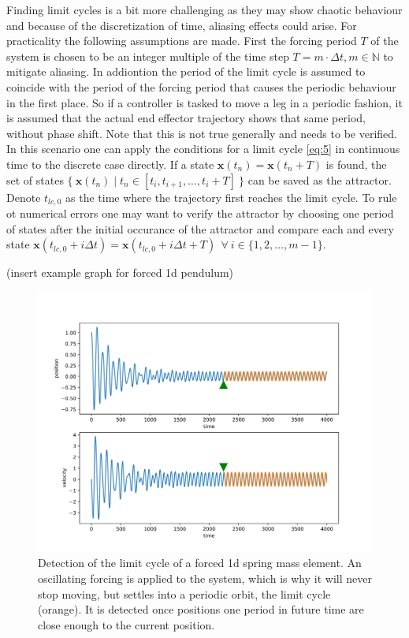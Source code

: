 Finding limit cycles is a bit more challenging as they may show chaotic behaviour and because of the discretization of time, aliasing effects could arise. For practicality the following assumptions are made. 
First the forcing period $T$ of the system is chosen to be an integer multiple of the time step $T = m\cdot \Delta t, m \in \mathbb{N}$ to mitigate aliasing. In addiontion the period of the limit cycle is assumed to coincide with the period of the forcing period that causes the periodic behaviour in the first place. So if a controller is tasked to move a leg in a periodic fashion, it is assumed that the actual end effector trajectory shows that same period, without phase shift. Note that this is not true generally and needs to be verified. 
In this scenario one can apply the conditions for a limit cycle \ref{eq:5} in continuous time to the discrete case directly.
If a state $\mathbf{x}(t_n) = \mathbf{x}(t_n+T)$ is found, the set of states $\{\ \mathbf{x}(t_n) \mid t_n \in [t_i,t_{i+1},\ldots,t_i+T]\ \}$ can be saved as the attractor. Denote $t_{lc,0}$ as the time where the trajectory first reaches the limit cycle. To rule ot numerical errors one may want to verify the attractor by choosing one period of states after the initial occurance of the attractor and compare each and every state $\mathbf{x}(t_{lc,0}+i\Delta t) = \mathbf{x}(t_{lc,0}+i\Delta t+T)\ \ \forall\ i \in \{1,2,\ldots, m-1\}$.

(insert example graph for forced 1d pendulum)
\begin{figure}[h]
\centering
\includegraphics[width=.7\textwidth]{figures/limit_cycle_detection.png}
\caption[Limit Cycle Detection]{Detection of the limit cycle of a forced 1d spring mass element. An oscillating forcing is applied to the system, which is why it will never stop moving, but settles into a periodic orbit, the limit cycle (orange). It is detected once positions one period in future time are close enough to the current position.}
\label{lcdet}
\end{figure}

